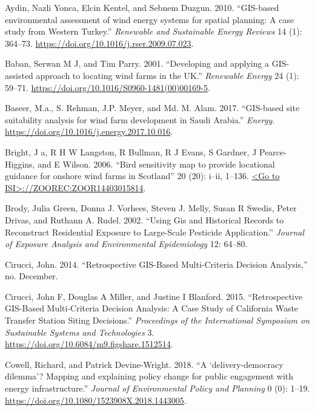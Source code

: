 \documentclass[a4paper,]{article}
\theoremstyle{definition}
\theoremstyle{definition}
\theoremstyle{definition}
\theoremstyle{remark}
\begin{document}
\leavevmode\hypertarget{ref-Aydin2010}{}%
Aydin, Nazli Yonca, Elcin Kentel, and Sebnem Duzgun. 2010. ``GIS-based
environmental assessment of wind energy systems for spatial planning: A
case study from Western Turkey.'' \emph{Renewable and Sustainable Energy
Reviews} 14 (1): 364--73.
\url{https://doi.org/10.1016/j.rser.2009.07.023}.

\leavevmode\hypertarget{ref-Baban2001}{}%
Baban, Serwan M J, and Tim Parry. 2001. ``Developing and applying a
GIS-assisted approach to locating wind farms in the UK.''
\emph{Renewable Energy} 24 (1): 59--71.
\url{https://doi.org/10.1016/S0960-1481(00)00169-5}.

\leavevmode\hypertarget{ref-Baseer2017}{}%
Baseer, M.a., S. Rehman, J.P. Meyer, and Md. M. Alam. 2017. ``GIS-based
site suitability analysis for wind farm development in Saudi Arabia.''
\emph{Energy}. \url{https://doi.org/10.1016/j.energy.2017.10.016}.

\leavevmode\hypertarget{ref-Bright2006}{}%
Bright, J a, R H W Langston, R Bullman, R J Evans, S Gardner, J
Pearce-Higgins, and E Wilson. 2006. ``Bird sensitivity map to provide
locational guidance for onshore wind farms in Scotland'' 20 (20): i--ii,
1--136.
\href{\%3CGo\%20to\%20ISI\%3E://ZOOREC:ZOOR14403015814}{\textless{}Go to ISI\textgreater{}://ZOOREC:ZOOR14403015814}.

\leavevmode\hypertarget{ref-Brody2002}{}%
Brody, Julia Green, Donna J. Vorhees, Steven J. Melly, Susan R Swedis,
Peter Drivas, and Ruthann A. Rudel. 2002. ``Using Gis and Historical
Records to Reconstruct Residential Exposure to Large-Scale Pesticide
Application.'' \emph{Journal of Exposure Analysis and Environmental
Epidemiology} 12: 64--80.

\leavevmode\hypertarget{ref-Cirucci2014}{}%
Cirucci, John. 2014. ``Retrospective GIS-Based Multi-Criteria Decision
Analysis,'' no. December.

\leavevmode\hypertarget{ref-Cirucci2015}{}%
Cirucci, John F, Douglas A Miller, and Justine I Blanford. 2015.
``Retrospective GIS-Based Multi-Criteria Decision Analysis: A Case Study
of California Waste Transfer Station Siting Decisions.''
\emph{Proceedings of the International Symposium on Sustainable Systems
and Technologies} 3. \url{https://doi.org/10.6084/m9.figshare.1512514}.

\leavevmode\hypertarget{ref-Cowell2018}{}%
Cowell, Richard, and Patrick Devine-Wright. 2018. ``A
`delivery-democracy dilemma'? Mapping and explaining policy change for
public engagement with energy infrastructure.'' \emph{Journal of
Environmental Policy and Planning} 0 (0): 1--19.
\url{https://doi.org/10.1080/1523908X.2018.1443005}.
\end{document}
